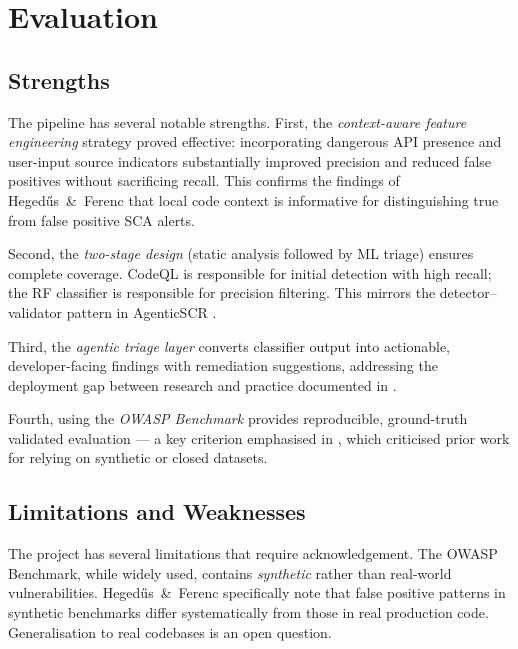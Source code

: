 \documentclass[conference]{IEEEtran}
\begin{document}
\section{Evaluation}
\label{sec:evaluation}

\subsection{Strengths}

The pipeline has several notable strengths. First, the \emph{context-aware feature
engineering} strategy proved effective: incorporating dangerous API presence and
user-input source indicators substantially improved precision and reduced false
positives without sacrificing recall. This confirms the findings of
Heged\H{u}s~\&~Ferenc \cite{hegedus2022sca} that local code context is
informative for distinguishing true from false positive SCA alerts.

Second, the \emph{two-stage design} (static analysis followed by ML triage)
ensures complete coverage. CodeQL is responsible for initial detection with high
recall; the RF classifier is responsible for precision filtering. This mirrors the
detector--validator pattern in AgenticSCR \cite{charoenwet2026agenticscr}.

Third, the \emph{agentic triage layer} converts classifier output into actionable,
developer-facing findings with remediation suggestions, addressing the deployment
gap between research and practice documented in \cite{bakane2025thesis}.

Fourth, using the \emph{OWASP Benchmark} provides reproducible, ground-truth
validated evaluation --- a key criterion emphasised in \cite{hegedus2022sca},
which criticised prior work for relying on synthetic or closed datasets.

\subsection{Limitations and Weaknesses}

The project has several limitations that require acknowledgement.
The OWASP Benchmark, while widely used, contains \emph{synthetic} rather than
real-world vulnerabilities. Heged\H{u}s~\&~Ferenc \cite{hegedus2022sca}
specifically note that false positive patterns in synthetic benchmarks differ
systematically from those in real production code. Generalisation to real
codebases is an open question.
\end{document}
